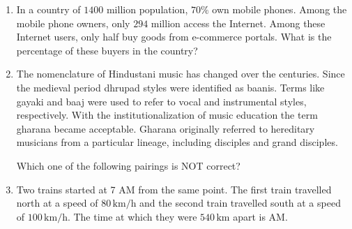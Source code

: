 \documentclass[journal,12pt,onecolumn]{IEEEtran}
\theoremstyle{remark}
\begin{document}
\begin{enumerate}[start=1, label=Q.\arabic*]
\hfill{}


\item In a country of $1400$ million population, $70\%$ own mobile phones. Among the mobile phone owners, only $294$ million access the Internet. Among these Internet users, only half buy goods from e-commerce portals. What is the percentage of these buyers in the country?  
\begin{enumerate}
\end{enumerate}

\hfill{}


\item The nomenclature of Hindustani music has changed over the centuries. Since the medieval period dhrupad styles were identified as baanis. Terms like gayaki and baaj were used to refer to vocal and instrumental styles, respectively. With the institutionalization of music education the term gharana became acceptable. Gharana originally referred to hereditary musicians from a particular lineage, including disciples and grand disciples.  

Which one of the following pairings is NOT correct?  
\begin{enumerate}
\end{enumerate}

\hfill{}


\item Two trains started at 7 AM from the same point. The first train travelled north at a speed of $80 \, \text{km/h}$ and the second train travelled south at a speed of $100 \, \text{km/h}$. The time at which they were $540 \, \text{km}$ apart is AM.  
\begin{enumerate}
\end{enumerate}


\end{enumerate}
\end{document}
